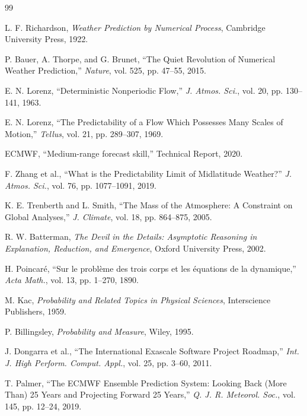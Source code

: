 \documentclass[twocolumn,10pt,a4paper]{article}
\theoremstyle{definition}
\theoremstyle{remark}
\begin{document}

\begin{thebibliography}{99}

L. F. Richardson,
\textit{Weather Prediction by Numerical Process},
Cambridge University Press, 1922.

P. Bauer, A. Thorpe, and G. Brunet,
``The Quiet Revolution of Numerical Weather Prediction,''
\textit{Nature}, vol. 525, pp. 47--55, 2015.

E. N. Lorenz,
``Deterministic Nonperiodic Flow,''
\textit{J. Atmos. Sci.}, vol. 20, pp. 130--141, 1963.

E. N. Lorenz,
``The Predictability of a Flow Which Possesses Many Scales of Motion,''
\textit{Tellus}, vol. 21, pp. 289--307, 1969.

ECMWF,
``Medium-range forecast skill,''
Technical Report, 2020.

F. Zhang et al.,
``What is the Predictability Limit of Midlatitude Weather?''
\textit{J. Atmos. Sci.}, vol. 76, pp. 1077--1091, 2019.

K. E. Trenberth and L. Smith,
``The Mass of the Atmosphere: A Constraint on Global Analyses,''
\textit{J. Climate}, vol. 18, pp. 864--875, 2005.

R. W. Batterman,
\textit{The Devil in the Details: Asymptotic Reasoning in Explanation, Reduction, and Emergence},
Oxford University Press, 2002.

H. Poincaré,
``Sur le problème des trois corps et les équations de la dynamique,''
\textit{Acta Math.}, vol. 13, pp. 1--270, 1890.

M. Kac,
\textit{Probability and Related Topics in Physical Sciences},
Interscience Publishers, 1959.

P. Billingsley,
\textit{Probability and Measure},
Wiley, 1995.

J. Dongarra et al.,
``The International Exascale Software Project Roadmap,''
\textit{Int. J. High Perform. Comput. Appl.}, vol. 25, pp. 3--60, 2011.

T. Palmer,
``The ECMWF Ensemble Prediction System: Looking Back (More Than) 25 Years and Projecting Forward 25 Years,''
\textit{Q. J. R. Meteorol. Soc.}, vol. 145, pp. 12--24, 2019.


\end{thebibliography}
\end{document}
